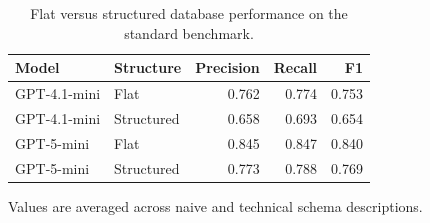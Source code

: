 \begin{table}[htbp]
\centering
\small
\caption{Flat versus structured database performance on the standard benchmark.}
\label{tab:database-structure-standard}
\begin{tabular}{llrrr}
\toprule
Model & Structure & Precision & Recall & F1 \\
\midrule
GPT-4.1-mini & Flat & 0.762 & 0.774 & 0.753 \\
GPT-4.1-mini & Structured & 0.658 & 0.693 & 0.654 \\
GPT-5-mini & Flat & 0.845 & 0.847 & 0.840 \\
GPT-5-mini & Structured & 0.773 & 0.788 & 0.769 \\
\bottomrule
\end{tabular}
\par\footnotesize{Values are averaged across naive and technical schema descriptions.}
\end{table}
